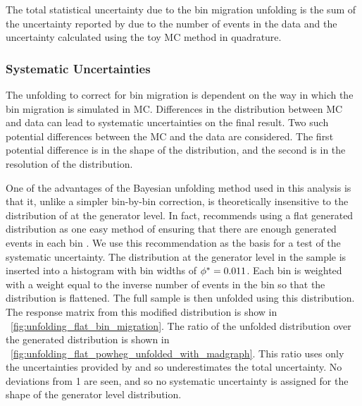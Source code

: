 The total statistical uncertainty due to the bin migration unfolding is the
sum of the uncertainty reported by \RooUnfold due to the number of events in
the data and the uncertainty calculated using the toy MC method in quadrature.

\subsubsection{Systematic Uncertainties}
\label{ssec:unfolding_systematic_uncertainties}

The unfolding to correct for bin migration is dependent on the way in which the
bin migration is simulated in MC. Differences in the \phistar distribution
between MC and data can lead to systematic uncertainties on the final result.
Two such potential differences between the MC and the data are considered. The
first potential difference is in the shape of the \phistar distribution, and
the second is in the resolution of the \phistar distribution.

One of the advantages of the Bayesian unfolding method used in this analysis is
that it, unlike a simpler bin-by-bin correction, is theoretically insensitive
to the distribution of \phistar at the generator level. In fact, \DAgostini
recommends using a flat generated distribution as one easy method of ensuring
that there are enough generated events in each bin \cite{dagostini_1995}. We
use this recommendation as the basis for a test of the systematic uncertainty.
The \phistar distribution at the generator level in the \MADGRAPH sample is
inserted into a histogram with bin widths of $\phi^{*} = 0.011$. Each bin is
weighted with a weight equal to the inverse number of events in the bin so that
the distribution is flattened. The full \POWHEG sample is then unfolded using
this \MADGRAPH distribution. The response matrix from this modified \MADGRAPH
distribution is show in \FIG~\ref{fig:unfolding_flat_bin_migration}. The ratio
of the unfolded \POWHEG distribution over the generated distribution is shown
in \FIG~\ref{fig:unfolding_flat_powheg_unfolded_with_madgraph}. This ratio uses
only the uncertainties provided by \RooUnfold and so underestimates the total
uncertainty. No deviations from \num{1} are seen, and so no systematic
uncertainty is assigned for the shape of the generator level \phistar
distribution.

